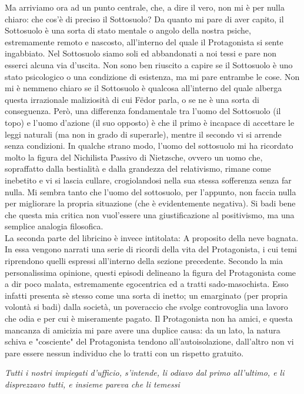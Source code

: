 \documentclass[12pt,a4paper]{report}
\theoremstyle{definition}
\theoremstyle{Theorem}
\theoremstyle{definition}
\theoremstyle{definition}
\theoremstyle{definition}
\begin{document}
Ma arriviamo ora ad un punto centrale, che, a dire il vero, non mi è per nulla chiaro: che cos'è di preciso il Sottosuolo? Da quanto mi pare di aver capito, il Sottosuolo è una sorta di stato mentale o angolo della nostra psiche, estremamente remoto e nascosto, all'interno del quale il Protagonista si sente ingabbiato. Nel Sottosuolo siamo soli ed abbandonati a noi tessi e pare non esserci alcuna via d'uscita. Non sono ben riuscito a capire se il Sottosuolo è uno stato psicologico o una condizione di esistenza, ma mi pare entrambe le cose. Non mi è nemmeno chiaro se il Sottosuolo è qualcosa all'interno del quale alberga questa irrazionale maliziosità di cui Fëdor parla, o se ne è una sorta di conseguenza. Però, una differenza fondamentale tra l'uomo del Sottosuolo (il topo) e l'uomo d'azione (il suo opposto) è che il primo è incapace di accettare le leggi naturali (ma non in grado di superarle), mentre il secondo vi si arrende senza condizioni. In qualche strano modo, l'uomo del sottosuolo mi ha ricordato molto la figura del Nichilista Passivo di Nietzsche, ovvero un uomo che, sopraffatto dalla bestialità e dalla grandezza del relativismo, rimane come inebetito e vi si lascia cullare, crogiolandosi nella sua stessa sofferenza senza far nulla. Mi sembra tanto che l'uomo del sottosuolo, per l'appunto, non faccia nulla per migliorare la propria situazione (che è evidentemente negativa). Si badi bene che questa mia critica non vuol'essere una giustificazione al positivismo, ma una semplice analogia filosofica.\\
La seconda parte del libricino è invece intitolata: A proposito della neve bagnata. In essa vengono narrati una serie di ricordi della vita del Protagonista, i cui temi riprendono quelli espressi all'interno della sezione precedente. Secondo la mia personalissima opinione, questi episodi delineano la figura del Protagonista come a dir poco malata, estremamente egocentrica ed a tratti sado-masochista. Esso infatti presenta sè stesso come una sorta di inetto; un emarginato (per propria volontà si badi) dalla società, un poveraccio che svolge controvoglia una lavoro che odia e per cui è miseramente pagato. Il Protagonista non ha amici, e questa mancanza di amicizia mi pare avere una duplice causa: da un lato, la natura schiva e "cosciente" del Protagonista tendono all'autoisolazione, dall'altro non vi pare essere nessun individuo che lo tratti con un rispetto gratuito. 
\begin{center}
	\textit{Tutti i nostri impiegati d'ufficio, s'intende, li odiavo dal primo all'ultimo, e li disprezzavo tutti, e insieme pareva che li temessi}
\end{center}
\end{document}
